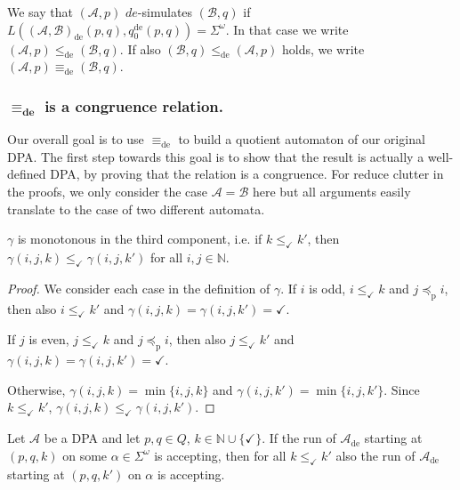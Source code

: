 \begin{defn}
	We say that $(\mathcal{A}, p)$ $de$-simulates $(\mathcal{B}, q)$ if $L((\mathcal{A}, \mathcal{B})_\text{de}(p, q), q_0^\text{de}(p, q)) = \Sigma^\omega$. In that case we write $(\mathcal{A}, p) \leq_\text{de} (\mathcal{B}, q)$. If also $(\mathcal{B}, q) \leq_\text{de} (\mathcal{A}, p)$ holds, we write $(\mathcal{A}, p) \equiv_\text{de} (\mathcal{B}, q)$.
\end{defn}



\vspace{1cm}
\subsubsection*{$\boldsymbol{\equiv_\text{de}}$ is a congruence relation.}
Our overall goal is to use $\equiv_\text{de}$ to build a quotient automaton of our original DPA. The first step towards this goal is to show that the result is actually a well-defined DPA, by proving that the relation is a congruence. For reduce clutter in the proofs, we only consider the case $\mathcal{A} = \mathcal{B}$ here but all arguments easily translate to the case of two different automata.

\begin{lem}
\label{lem:fritzwilke:gamma_mono}
	$\gamma$ is monotonous in the third component, i.e. if $k \leq_\checkmark k'$, then $\gamma(i, j, k) \leq_\checkmark \gamma(i, j, k')$ for all $i, j \in \mathbb{N}$.
\end{lem}

\begin{proof}
	We consider each case in the definition of $\gamma$. If $i$ is odd, $i \leq_\checkmark k$ and $j \preceq_\text{p} i$, then also $i \leq_\checkmark k'$ and $\gamma(i, j, k) = \gamma(i, j, k') = \checkmark$.
	
	If $j$ is even, $j \leq_\checkmark k$ and $j \preceq_\text{p} i$, then also $j \leq_\checkmark k'$ and $\gamma(i, j, k) = \gamma(i, j, k') = \checkmark$.
	
	Otherwise, $\gamma(i, j, k) = \min \{i, j, k\}$ and $\gamma(i, j, k') = \min \{i, j, k'\}$. Since $k \leq_\checkmark k'$, $\gamma(i, j, k) \leq_\checkmark \gamma(i, j, k')$.
\end{proof}

\begin{lem}
\label{lem:fritzwilke:gamma_mono_ext}
	Let $\mathcal{A}$ be a DPA and let $p, q \in Q$, $k \in \mathbb{N} \cup \{\checkmark\}$. If the run of $\mathcal{A}_\text{de}$ starting at $(p, q, k)$ on some $\alpha \in \Sigma^\omega$ is accepting, then for all $k \leq_\checkmark k'$ also the run of $\mathcal{A}_\text{de}$ starting at $(p, q, k')$ on $\alpha$ is accepting.
\end{lem}

